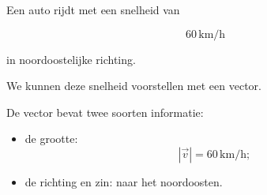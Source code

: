 \documentclass{ximera}
\begin{document}
\begin{voorbeeld}

Een auto rijdt met een snelheid van

\[
60\,\si{\kilo\meter\per\hour}
\]

in noordoostelijke richting.

We kunnen deze snelheid voorstellen met een vector.

\begin{center}
\end{center}

De vector bevat twee soorten informatie:

\begin{itemize}
    \item de grootte:
    \[
    |\vec{v}| = 60\,\si{\kilo\meter\per\hour};
    \]

    \item de richting en zin: naar het noordoosten.
\end{itemize}

\end{voorbeeld}


\end{document}
